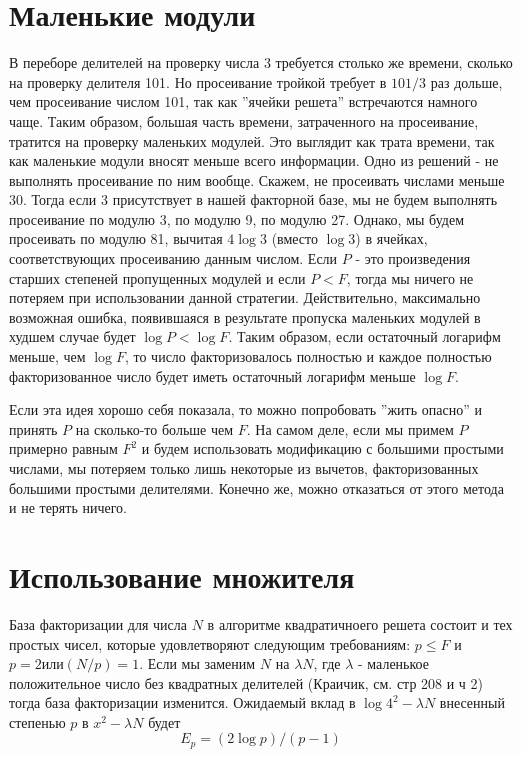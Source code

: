 \documentclass[a4paper,12pt]{report}
\begin{document}
\section{Маленькие модули}
В переборе делителей на проверку числа 3 требуется столько же времени, сколько на проверку делителя 101. Но просеивание тройкой требует в $101/3$ раз дольше, чем просеивание числом 101, так как ''ячейки решета'' встречаются намного чаще. Таким образом, большая часть времени, затраченного на просеивание, тратится на проверку маленьких модулей. Это выглядит как трата времени, так как маленькие модули вносят меньше всего информации. Одно из решений - не выполнять просеивание по ним вообще. Скажем, не просеивать числами меньше 30. Тогда если 3 присутствует в нашей факторной базе, мы не будем выполнять просеивание по модулю 3, по модулю 9, по модулю 27. Однако, мы будем просеивать по модулю 81, вычитая $4\log{3}$ (вместо $\log{3}$) в ячейках, соответствующих просеиванию данным числом. Если $P$ - это произведения старших степеней пропущенных модулей и если $P < F$, тогда мы ничего не потеряем при использовании данной стратегии. Действительно, максимально возможная ошибка, появившаяся в результате пропуска маленьких модулей в худшем случае будет $\log{P} < \log{F}$. Таким образом, если остаточный логарифм меньше, чем $\log{F}$, то число факторизовалось полностью и каждое полностью факторизованное число будет иметь остаточный логарифм меньше $\log{F}$.

Если эта идея хорошо себя показала, то можно попробовать ''жить опасно'' и принять $P$ на сколько-то больше чем $F$. На самом деле, если мы примем $P$ примерно равным $F^2$ и будем использовать модификацию с большими простыми числами, мы потеряем только лишь некоторые из вычетов, факторизованных большими простыми делителями. Конечно же, можно отказаться от этого метода и не терять ничего.

\section{Использование множителя}
База факторизации для числа $N$ в алгоритме квадратичноего решета состоит и тех простых чисел, которые удовлетворяют следующим требованиям: $p \leq F$ и $p = 2 или (N/p) = 1$. Если мы заменим $N$ на $\lambda N$, где $\lambda$ - маленькое положительное число без квадратных делителей (Краичик, см. \cite{krai} стр 208 и \cite{krai2} ч 2) тогда база факторизации изменится. Ожидаемый вклад в $\log{4^2 - \lambda N}$ внесенный степенью $p$ в $x^2 - \lambda N$ будет
\begin{equation*}
E_p = (2 \log{p})/(p-1) 
\end{equation*}
\end{document}
